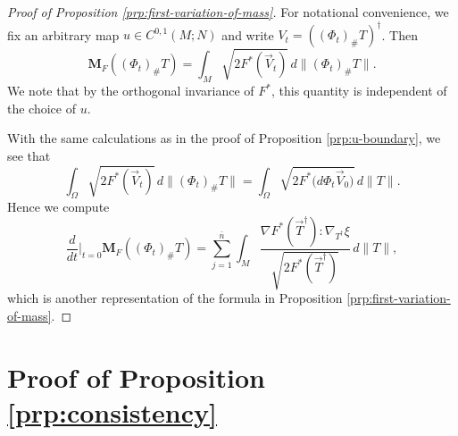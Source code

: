 \documentclass[10pt,a4paper]{amsart}
\newcommand{\M}{\mathbf{M}}
\newcommand{\ndim}{{\bar{n}}}
\begin{document}
\begin{proof}[Proof of Proposition \ref{prp:first-variation-of-mass}]
For notational convenience, we fix an arbitrary map $u \in C^{0, 1}(M; N)$ and
write $V_t = ((\Phi_t)_\# T)^\dagger$. Then
\[
\M_F((\Phi_t)_\# T) = \int_M \sqrt{2F^*(\vec{V}_t)} \, d\|(\Phi_t)_\# T\|.
\]
We note that by the orthogonal
invariance of $F^*$, this quantity is independent of the choice of $u$.

With the same calculations as in the proof of Proposition \ref{prp:u-boundary}, we see that
\[
\int_\Omega \sqrt{2F^*(\vec{V}_t)} \, d\|(\Phi_t)_\# T\| = \int_\Omega \sqrt{2F^*\bigl(d\Phi_t \vec{V}_0\bigr)} \, d\|T\|.
\]
Hence we compute
\[
\frac{d}{dt}\Bigr|_{t = 0} \M_F((\Phi_t)_\# T) = \sum_{j = 1}^\ndim \int_M \frac{\nabla F^*(\vec{T}^\dagger) : \nabla_{T^\dagger} \xi}{\sqrt{2 F^*(\vec{T}^\dagger)}} \, d\|T\|,
\]
which is another representation of the formula in Proposition \ref{prp:first-variation-of-mass}.
\end{proof}








\section{Proof of Proposition \ref{prp:consistency}} \label{sct:consistency}
\end{document}
